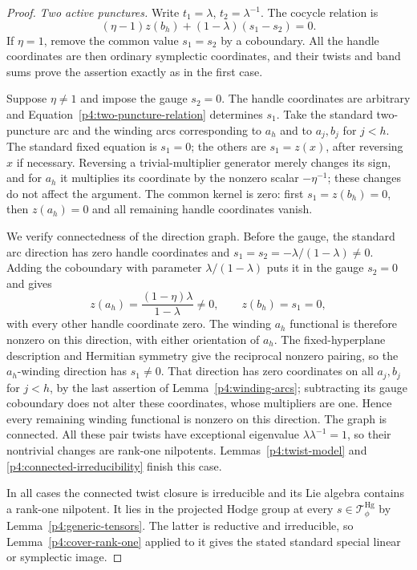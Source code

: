 \documentclass[11pt]{article}
\theoremstyle{plain}
\theoremstyle{definition}
\theoremstyle{remark}
\numberwithin{equation}{section}
\begin{document}
\begin{proof}
\emph{Two active punctures.}  Write $t_1=\lambda$,
$t_2=\lambda^{-1}$.  The cocycle relation is
\begin{equation}\label{p4:two-puncture-relation}
 (\eta-1)z(b_h)+(1-\lambda)(s_1-s_2)=0.
\end{equation}
If $\eta=1$, remove the common value $s_1=s_2$ by a coboundary.
All the handle coordinates are then ordinary symplectic coordinates,
and their twists and band sums prove the assertion exactly as in the
first case.

Suppose $\eta\ne1$ and impose the gauge $s_2=0$.  The handle
coordinates are arbitrary and Equation~\eqref{p4:two-puncture-relation}
determines $s_1$.  Take the standard two-puncture arc and the winding
arcs corresponding to $a_h$ and to $a_j,b_j$ for $j<h$.  The standard
fixed equation is $s_1=0$; the others are $s_1=z(x)$, after reversing
$x$ if necessary.  Reversing a trivial-multiplier generator merely
changes its sign, and for $a_h$ it multiplies its coordinate by the
nonzero scalar $-\eta^{-1}$; these changes do not affect the argument.
The common kernel is zero: first $s_1=z(b_h)=0$, then $z(a_h)=0$ and
all remaining handle coordinates vanish.

We verify connectedness of the direction graph.  Before the gauge,
the standard arc direction has zero handle coordinates and
$s_1=s_2=-\lambda/(1-\lambda)\ne0$.  Adding the coboundary with
parameter $\lambda/(1-\lambda)$ puts it in the gauge $s_2=0$ and gives
\[
 z(a_h)=\frac{(1-\eta)\lambda}{1-\lambda}\ne0,
 \qquad z(b_h)=s_1=0,
\]
with every other handle coordinate zero.  The winding $a_h$
functional is therefore nonzero on this direction, with either
orientation of $a_h$.  The fixed-hyperplane description and Hermitian
symmetry give the reciprocal nonzero pairing, so the $a_h$-winding
direction has $s_1\ne0$.  That direction has zero coordinates on all
$a_j,b_j$ for $j<h$, by the last assertion of
Lemma~\ref{p4:winding-arcs}; subtracting its gauge coboundary does not
alter these coordinates, whose multipliers are one.  Hence every
remaining winding functional is nonzero on this direction.  The graph
is connected.  All these pair twists have exceptional eigenvalue
$\lambda\lambda^{-1}=1$, so their nontrivial changes are rank-one
nilpotents.  Lemmas~\ref{p4:twist-model} and
\ref{p4:connected-irreducibility} finish this case.

In all cases the connected twist closure is irreducible and its Lie
algebra contains a rank-one nilpotent.  It lies in the projected Hodge
group at every $s\in\mathcal T_\phi^{\mathrm{Hg}}$ by
Lemma~\ref{p4:generic-tensors}.  The latter is
reductive and irreducible, so Lemma~\ref{p4:cover-rank-one} applied to it
gives the stated standard special linear or symplectic image.


\end{proof}
\end{document}
